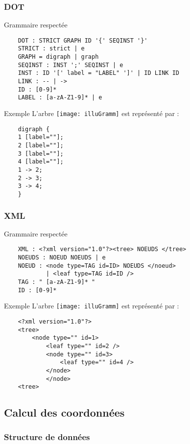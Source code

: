 \begin{frame}
    \frametitle{DOT}
    \begin{block}{Grammaire respectée}
    \begin{verbatim}
    DOT : STRICT GRAPH ID '{' SEQINST '}'
    STRICT : strict | e
    GRAPH = digraph | graph
    SEQINST : INST ';' SEQINST | e
    INST : ID '[' label = "LABEL" ']' | ID LINK ID
    LINK : -- | ->
    ID : [0-9]*
    LABEL : [a-zA-Z1-9]* | e
    \end{verbatim}
    \end{block}
    \begin{exampleblock}{Exemple}
    L'arbre \texttt{[image: illuGramm]} est représenté par :
    \begin{verbatim}
    digraph {
    1 [label=""];
    2 [label=""];
    3 [label=""];
    4 [label=""];
    1 -> 2;
    2 -> 3;
    3 -> 4;
    }
    \end{verbatim}
    \end{exampleblock}
\end{frame}

\begin{frame}
    \frametitle{XML}
    \begin{block}{Grammaire respectée}
    \begin{verbatim}
    XML : <?xml version="1.0"?><tree> NOEUDS </tree>
    NOEUDS : NOEUD NOEUDS | e
    NOEUD : <node type=TAG id=ID> NOEUDS </noeud>
            | <leaf type=TAG id=ID />
    TAG : " [a-zA-Z1-9]* "
    ID : [0-9]*
    \end{verbatim}
    \end{block}
    \begin{exampleblock}{Exemple}
    L'arbre \texttt{[image: illuGramm]} est représenté par :
    \begin{verbatim}
    <?xml version="1.0"?>
    <tree>
        <node type="" id=1>
            <leaf type="" id=2 />
            <node type="" id=3>
                <leaf type="" id=4 />
            </node>
    	    </node>
    <tree>
    \end{verbatim}
    \end{exampleblock}
\end{frame}

\subsection{Calcul des coordonnées}

\begin{frame}
	\frametitle{Structure de données}
	
\end{frame}

